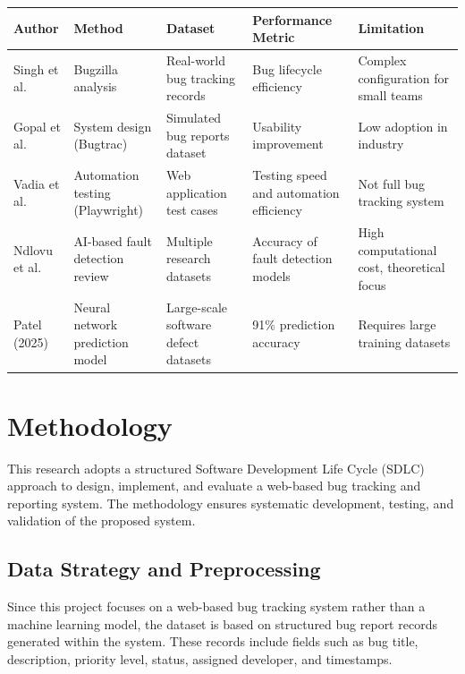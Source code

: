 \documentclass[12pt]{article}
\begin{document}
\begin{table}[h!]
\centering
\renewcommand{\arraystretch}{1.5}

\begin{tabular}{|p{2.5cm}|p{3cm}|p{3cm}|p{3cm}|p{3cm}|}
\hline
\textbf{Author} & \textbf{Method} & \textbf{Dataset} & \textbf{Performance Metric} & \textbf{Limitation} \\
\hline

Singh et al. & Bugzilla analysis & Real-world bug tracking records & Bug lifecycle efficiency & Complex configuration for small teams \\
\hline

Gopal et al. & System design (Bugtrac) & Simulated bug reports dataset & Usability improvement & Low adoption in industry \\
\hline

Vadia et al. & Automation testing (Playwright) & Web application test cases & Testing speed and automation efficiency & Not full bug tracking system \\
\hline

Ndlovu et al. & AI-based fault detection review & Multiple research datasets & Accuracy of fault detection models & High computational cost, theoretical focus \\
\hline

Patel (2025) & Neural network prediction model & Large-scale software defect datasets & 91\% prediction accuracy & Requires large training datasets \\
\hline

\end{tabular}
\end{table}
\section{Methodology}

This research adopts a structured Software Development Life Cycle (SDLC) approach to design, implement, and evaluate a web-based bug tracking and reporting system. The methodology ensures systematic development, testing, and validation of the proposed system.
\subsection{Data Strategy and Preprocessing}

Since this project focuses on a web-based bug tracking system rather than a machine learning model, the dataset is based on structured bug report records generated within the system. These records include fields such as bug title, description, priority level, status, assigned developer, and timestamps.
\end{document}
